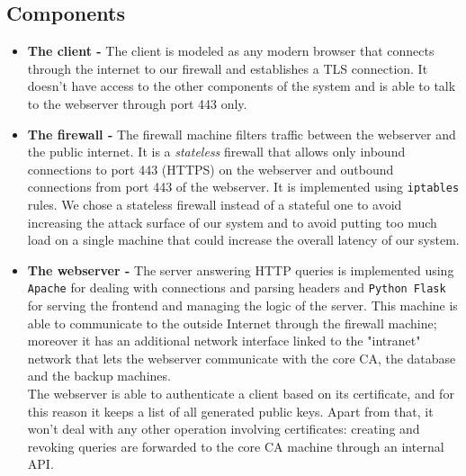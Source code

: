 \documentclass[english]{article}
\begin{document}
\subsection{Components}
\label{Components}


\begin{itemize}
	\item \textbf{The client - } The client is modeled as any modern browser that connects through the internet to our firewall and establishes a TLS connection.  It doesn't have access to the other components of the system and is able to talk to the webserver through port 443 only. 
	\item \textbf{The firewall -} The firewall machine filters traffic between the webserver and the public internet. It is a \emph{stateless} firewall that allows only inbound connections to port 443 (HTTPS) on the webserver and outbound connections from port 443 of the webserver.  It is implemented using \texttt{iptables} rules.
		We chose a stateless firewall instead of a stateful one to avoid increasing the attack surface of our system and to avoid putting too much load on a single machine that could increase the overall latency of our system.
	\item \textbf{The webserver -} The server answering HTTP queries is implemented using \texttt{Apache} for dealing with connections and parsing headers and \texttt{Python Flask} for serving the frontend and managing the logic of the server. This machine is able to communicate to the outside Internet through the firewall machine; moreover it has an additional network interface linked to the "intranet" network that lets the webserver communicate with the core CA, the database and the backup machines.   \\
		The webserver is able to authenticate a client based on its certificate, and for this reason it keeps a list of all generated public keys.  Apart from that, it won't deal with any other operation involving certificates: creating and revoking queries are forwarded to the core CA machine through an internal API.  \\

\end{itemize}
\end{document}
